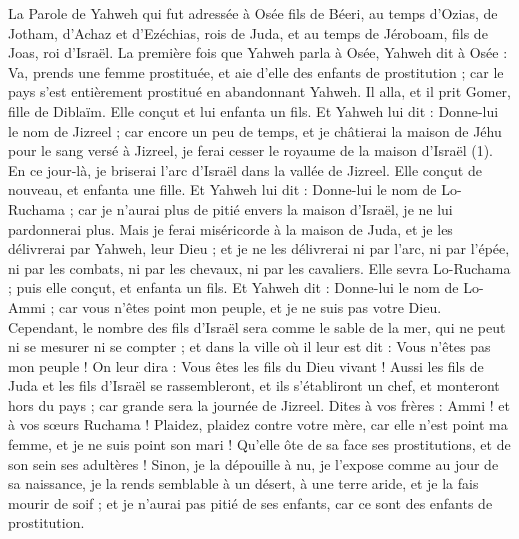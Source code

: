 \BFont
\begin{multicols}{2}
\TextTitle{[Introduction]}
\VerseOne{}La Parole de Yahweh qui fut adressée à Osée fils de Béeri, au temps d’Ozias, de Jotham, d’Achaz et d’Ezéchias, rois de Juda, et au temps de Jéroboam, fils de Joas, roi d'Israël.
La première fois que Yahweh parla à Osée, Yahweh dit à Osée : Va, prends une femme prostituée, et aie d'elle des enfants de prostitution ; car le pays s’est entièrement prostitué en abandonnant Yahweh.
Il alla, et il prit Gomer, fille de Diblaïm. Elle conçut et lui enfanta un fils.
Et Yahweh lui dit : Donne-lui le nom de Jizreel ; car encore un peu de temps, et je châtierai la maison de Jéhu pour le sang versé à Jizreel, je ferai cesser le royaume de la maison d'Israël (1).
En ce jour-là, je briserai l'arc d'Israël dans la vallée de Jizreel.
Elle conçut de nouveau, et enfanta une fille. Et Yahweh lui dit : Donne-lui le nom de Lo-Ruchama ; car je n’aurai plus de pitié envers la maison d'Israël, je ne lui pardonnerai plus.
Mais je ferai miséricorde à la maison de Juda, et je les délivrerai par Yahweh, leur Dieu ; et je ne les délivrerai ni par l'arc, ni par l'épée, ni par les combats, ni par les chevaux, ni par les cavaliers.
Elle sevra Lo-Ruchama ; puis elle conçut, et enfanta un fils.
Et Yahweh dit : Donne-lui le nom de Lo-Ammi ; car vous n'êtes point mon peuple, et je ne suis pas votre Dieu.
\VerseOne{}Cependant, le nombre des fils d'Israël sera comme le sable de la mer, qui ne peut ni se mesurer ni se compter ; et dans la ville où il leur est dit : Vous n’êtes pas mon peuple ! On leur dira : Vous êtes les fils du Dieu vivant !
Aussi les fils de Juda et les fils d'Israël se rassembleront, et ils s'établiront un chef, et monteront hors du pays ; car grande sera la journée de Jizreel.
Dites à vos frères : Ammi ! et à vos sœurs Ruchama !
Plaidez, plaidez contre votre mère, car elle n’est point ma femme, et je ne suis point son mari ! Qu’elle ôte de sa face ses prostitutions, et de son sein ses adultères !
Sinon, je la dépouille à nu, je l’expose comme au jour de sa naissance, je la rends semblable à un désert, à une terre aride, et je la fais mourir de soif ;
et je n’aurai pas pitié de ses enfants, car ce sont des enfants de prostitution.

\end{multicols}
